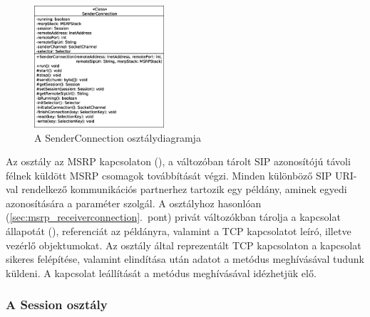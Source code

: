 \begin{figure}
  \vspace{-15pt}
  \begin{center}
    \includegraphics[width=0.43\textwidth]{img/class_diagrams/SenderConnection.eps}
  \end{center}
  \vspace{-15pt}
  \captionsetup{font=scriptsize}
  \caption{A SenderConnection osztálydiagramja}
   \label{fig:class_senderconnection}
  \vspace{-10pt}
\end{figure}
Az osztály az MSRP kapcsolaton (), a  változóban tárolt SIP azonosítójú távoli félnek küldött MSRP csomagok továbbítását végzi. Minden különböző SIP URI-val rendelkező kommunikációs partnerhez tartozik egy  példány, aminek egyedi azonosítására a  paraméter szolgál. A  osztályhoz hasonlóan (\ref{sec:msrp_receiverconnection}.~pont) privát változókban tárolja a kapcsolat állapotát (), referenciát az  példányra, valamint a TCP kapcsolatot leíró, illetve vezérlő objektumokat. Az osztály által reprezentált TCP kapcsolaton a kapcsolat sikeres felépítése, valamint elindítása után adatot a  metódus meghívásával tudunk küldeni. A kapcsolat leállítását a  metódus meghívásával idézhetjük elő.

\subsubsection*{A Session osztály}
\label{sec:msrp_session}

